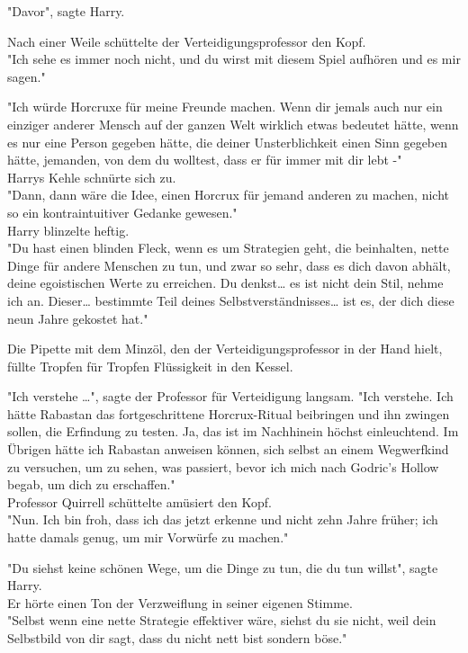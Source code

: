 {"Davor", sagte Harry.

Nach einer Weile schüttelte der Verteidigungsprofessor den Kopf.\\ "Ich sehe es immer noch nicht, und du wirst mit diesem Spiel aufhören und es mir sagen."

"Ich würde Horcruxe für meine Freunde machen. Wenn dir jemals auch nur ein einziger anderer Mensch auf der ganzen Welt wirklich etwas bedeutet hätte, wenn es nur eine Person gegeben hätte, die deiner Unsterblichkeit einen Sinn gegeben hätte, jemanden, von dem du wolltest, dass er für immer mit dir lebt -"\\ Harrys Kehle schnürte sich zu.\\ "Dann, dann wäre die Idee, einen Horcrux für jemand anderen zu machen, nicht so ein kontraintuitiver Gedanke gewesen."\\ Harry blinzelte heftig.\\ "Du hast einen blinden Fleck, wenn es um Strategien geht, die beinhalten, nette Dinge für andere Menschen zu tun, und zwar so sehr, dass es dich davon abhält, deine egoistischen Werte zu erreichen. Du denkst… es ist nicht dein Stil, nehme ich an. Dieser… bestimmte Teil deines Selbstverständnisses… ist es, der dich diese neun Jahre gekostet hat."

Die Pipette mit dem Minzöl, den der Verteidigungsprofessor in der Hand hielt, füllte Tropfen für Tropfen Flüssigkeit in den Kessel.

"Ich verstehe …", sagte der Professor für Verteidigung langsam. "Ich verstehe. Ich hätte Rabastan das fortgeschrittene Horcrux-Ritual beibringen und ihn zwingen sollen, die Erfindung zu testen. Ja, das ist im Nachhinein höchst einleuchtend. Im Übrigen hätte ich Rabastan anweisen können, sich selbst an einem Wegwerfkind zu versuchen, um zu sehen, was passiert, bevor ich mich nach Godric's Hollow begab, um dich zu erschaffen."\\ Professor Quirrell schüttelte amüsiert den Kopf.\\ "Nun. Ich bin froh, dass ich das jetzt erkenne und nicht zehn Jahre früher; ich hatte damals genug, um mir Vorwürfe zu machen."

"Du siehst keine schönen Wege, um die Dinge zu tun, die du tun willst", sagte Harry.\\ Er hörte einen Ton der Verzweiflung in seiner eigenen Stimme.\\ "Selbst wenn eine nette Strategie effektiver wäre, siehst du sie nicht, weil dein Selbstbild von dir sagt, dass du nicht nett bist sondern böse."

}
